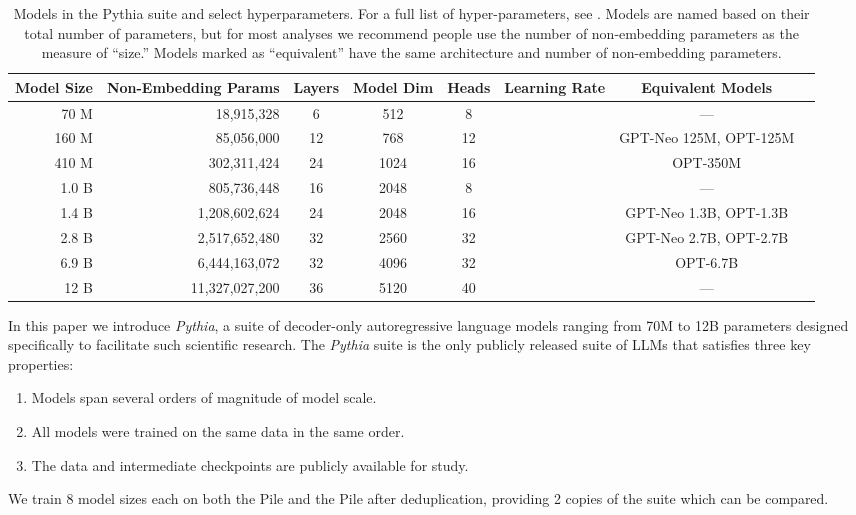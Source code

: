 \documentclass{article}
\theoremstyle{plain}
\theoremstyle{definition}
\theoremstyle{remark}
\begin{document}
\begin{table*}[ht]
    \centering
    \begin{tabular}{rrcccccc}\toprule
  Model Size & Non-Embedding Params & Layers & Model Dim & Heads & Learning Rate        & Equivalent Models\\\midrule
          70 M  &     18,915,328   &  6     &  512      &  8    &   & ---\\
         160 M  &     85,056,000   & 12     &  768      & 12    &   & GPT-Neo 125M, OPT-125M\\
         410 M  &    302,311,424   & 24     & 1024      & 16    &   & OPT-350M\\
         1.0 B  &    805,736,448   & 16     & 2048      &  8    &   & --- \\
         1.4 B  &  1,208,602,624   & 24     & 2048      & 16    &   & GPT-Neo 1.3B, OPT-1.3B\\
         2.8 B  &  2,517,652,480   & 32     & 2560      & 32    &   & GPT-Neo 2.7B, OPT-2.7B\\
         6.9 B  &  6,444,163,072   & 32     & 4096      & 32    &   & OPT-6.7B\\
          12 B  & 11,327,027,200   & 36     & 5120      & 40    &   & ---\\\bottomrule
	\end{tabular}
	\caption{Models in the Pythia suite and select hyperparameters. For a full list of hyper-parameters, see . Models are named based on their total number of parameters, but for most analyses we recommend people use the number of non-embedding parameters as the measure of ``size.'' Models marked as ``equivalent'' have the same architecture and number of non-embedding parameters.}
	\label{table:interp}
\end{table*}

In this paper we introduce \textit{Pythia}, a suite of decoder-only autoregressive language models ranging from 70M to 12B parameters designed specifically to facilitate such scientific research. The \textit{Pythia} suite is the only publicly released suite of LLMs that satisfies three key properties:
\begin{enumerate}
    \item Models span several orders of magnitude of model scale.
    \item All models were trained on the same data in the same order.
    \item The data and intermediate checkpoints are publicly available for study.
\end{enumerate}
We train 8 model sizes each on both the Pile \cite{gao2020pile,biderman2022datasheet} and the Pile after deduplication, providing 2 copies of the suite which can be compared.
\end{document}
